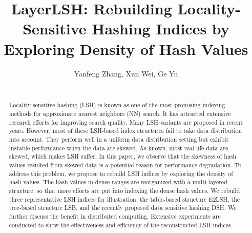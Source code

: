 \documentclass{vldb}
\begin{document}
\newcommand{\Paragraph}[1]{\smallskip{\bf #1.}}
\newcommand{\Paragraphnopunc}[1]{\smallskip\noindent{\bf #1}}
\newcommand{\Paragraphwithindent}[1]{\smallskip{\bf #1.}}
\newcommand{\tabincell}[2]{\begin{tabular}{@{}#1@{}}#2\end{tabular}}
\newcommand{\argmin}{\text{arg}\,\text{min}}
\newcommand{\argmax}{\text{arg}\,\text{max}}

\newtheorem{definition}{Definition}
\newtheorem{prop}{Proposition}
\newtheorem{lemma}{Lemma}
\newtheorem{theorem}{Theorem}


\title{LayerLSH: Rebuilding Locality-Sensitive Hashing Indices by Exploring Density of Hash Values}
\author{
\alignauthor
Yanfeng Zhang, Xun Wei, Ge Yu\\
      \\
}
\date{}
\maketitle

\begin{abstract}
Locality-sensitive hashing (LSH) is known as one of the most promising indexing methods for approximate nearest neighbors (NN) search. It has attracted extensive research efforts for improving search quality. Many LSH variants are proposed in recent years. However, most of these LSH-based index structures fail to take data distribution into account. They perform well in a uniform data distribution setting but exhibit instable performance when the data are skewed. As known, most real life data are skewed, which makes LSH suffer. In this paper, we observe that the skewness of hash values resulted from skewed data is a potential reason for performance degradation. To address this problem, we propose to rebuild LSH indices by exploring the density of hash values. The hash values in dense ranges are reorganized with a multi-layered structure, so that more efforts are put into indexing the dense hash values. We rebuild three representative LSH indices for illustration, the table-based structure E2LSH, the tree-based structure LSB, and the recently proposed data sensitive hashing DSH. We further discuss the benefit in distributed computing. Extensive experiments are conducted to show the effectiveness and efficiency of the reconstructed LSH indices.
\end{abstract}





%











\end{document}

